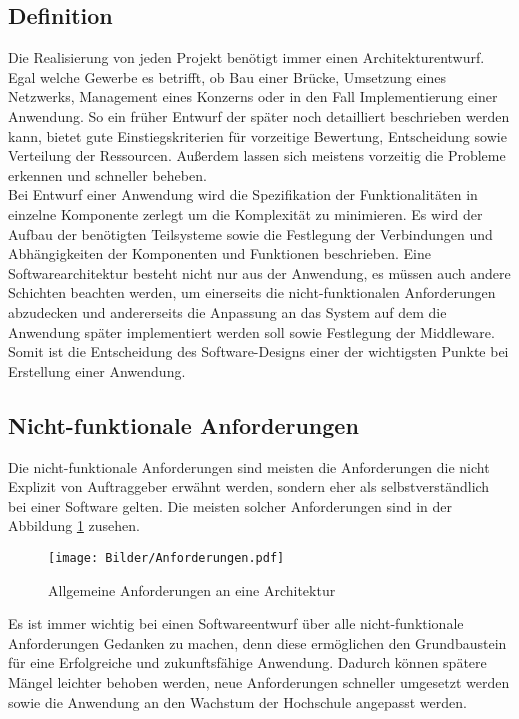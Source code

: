 \subsection{Definition}
Die Realisierung von jeden Projekt benötigt immer einen Architekturentwurf. Egal welche Gewerbe es betrifft, ob Bau einer Brücke, Umsetzung eines Netzwerks, Management eines Konzerns oder in den Fall Implementierung einer Anwendung. So ein früher Entwurf der später noch detailliert beschrieben werden kann, bietet gute Einstiegskriterien für vorzeitige Bewertung, Entscheidung sowie Verteilung der Ressourcen. Außerdem lassen sich meistens vorzeitig die Probleme erkennen und schneller beheben. \\

Bei Entwurf einer Anwendung wird die Spezifikation der Funktionalitäten in einzelne Komponente zerlegt um die Komplexität zu minimieren. Es wird der Aufbau der benötigten Teilsysteme sowie die Festlegung der Verbindungen und Abhängigkeiten der Komponenten und Funktionen beschrieben. Eine Softwarearchitektur besteht nicht nur aus der Anwendung, es müssen auch andere Schichten beachten werden, um einerseits die nicht-funktionalen Anforderungen abzudecken und andererseits die Anpassung an das System auf dem die Anwendung später implementiert werden soll sowie Festlegung der Middleware.%
Somit ist die Entscheidung des Software-Designs einer der wichtigsten Punkte bei Erstellung einer Anwendung.

\subsection{Nicht-funktionale Anforderungen}
\label{sec:nfa}
Die nicht-funktionale Anforderungen sind meisten die Anforderungen die nicht Explizit von Auftraggeber erwähnt werden, sondern eher als selbstverständlich bei einer Software gelten. Die meisten solcher Anforderungen sind in der Abbildung \ref{fig:anforderungen} zusehen.
\begin{figure}[H]
\centering
\texttt{[image: Bilder/Anforderungen.pdf]}
\caption{Allgemeine Anforderungen an eine Architektur\label{fig:anforderungen}}
\end{figure}
Es ist immer wichtig bei einen Softwareentwurf über alle nicht-funktionale Anforderungen Gedanken zu machen, denn diese ermöglichen den Grundbaustein für eine Erfolgreiche und zukunftsfähige Anwendung. Dadurch können spätere Mängel leichter behoben werden, neue Anforderungen schneller umgesetzt werden sowie die Anwendung an den Wachstum der Hochschule angepasst werden.

